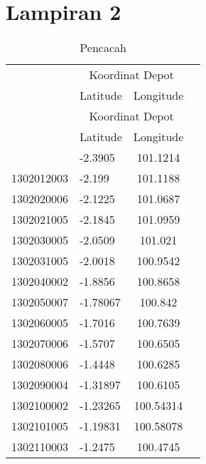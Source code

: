 \chapter*{Lampiran 2}


\begin{longtable}[h]{llcc}
	\caption{Pencacah}
	\label{tbl:enumerator_full}\\
	\toprule
		& \multicolumn{2}{c}{Koordinat Depot}\\
	\cmidrule{2-3}
		& Latitude & Longitude\\ 
	\midrule
	\endfirsthead
	\toprule
		& \multicolumn{2}{c}{Koordinat Depot}\\
	\cmidrule{2-3}
		& Latitude & Longitude\\ 
	\midrule
	\endhead
	\bottomrule
	\endfoot
		1302011008 & -2.3905 & 101.1214\\
		1302012003 & -2.199 & 101.1188\\
		1302020006 & -2.1225 & 101.0687\\
		1302021005 & -2.1845 & 101.0959\\
		1302030005 & -2.0509 & 101.021\\
		1302031005 & -2.0018 & 100.9542\\
		1302040002 & -1.8856 & 100.8658\\
		1302050007 & -1.78067 & 100.842\\
		1302060005 & -1.7016 & 100.7639\\
		1302070006 & -1.5707 & 100.6505\\
		1302080006 & -1.4448 & 100.6285\\
		1302090004 & -1.31897 & 100.6105\\
		1302100002 & -1.23265 & 100.54314\\
		1302101005 & -1.19831 & 100.58078\\
		1302110003 & -1.2475 & 100.4745\\
\end{longtable}